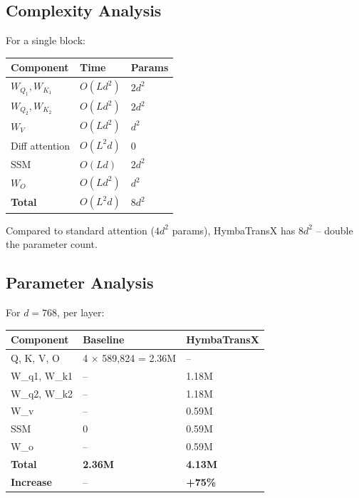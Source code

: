 \subsection{Complexity Analysis}

For a single block:

\begin{table}[H]
\centering
\small
\begin{tabular}{lll}
\toprule
\textbf{Component} & \textbf{Time} & \textbf{Params} \\
\midrule
$W_{Q_1}, W_{K_1}$ & $O(L d^2)$ & $2 d^2$ \\
$W_{Q_2}, W_{K_2}$ & $O(L d^2)$ & $2 d^2$ \\
$W_V$ & $O(L d^2)$ & $d^2$ \\
Diff attention & $O(L^2 d)$ & 0 \\
SSM & $O(L d)$ & $2 d^2$ \\
$W_O$ & $O(L d^2)$ & $d^2$ \\
\textbf{Total} & $O(L^2 d)$ & $8 d^2$ \\
\bottomrule
\end{tabular}
\end{table}

Compared to standard attention ($4 d^2$ params), HymbaTransX has \textbf{$8 d^2$} -- 
double the parameter count.

\subsection{Parameter Analysis}

For $d = 768$, per layer:

\begin{table}[H]
\centering
\small
\begin{tabular}{lll}
\toprule
\textbf{Component} & \textbf{Baseline} & \textbf{HymbaTransX} \\
\midrule
Q, K, V, O & 4 $\times$ 589,824 = 2.36M & -- \\
W\_q1, W\_k1 & -- & 1.18M \\
W\_q2, W\_k2 & -- & 1.18M \\
W\_v & -- & 0.59M \\
SSM & 0 & 0.59M \\
W\_o & -- & 0.59M \\
\textbf{Total} & \textbf{2.36M} & \textbf{4.13M} \\
\textbf{Increase} & -- & \textbf{+75\%} \\
\bottomrule
\end{tabular}
\end{table}

